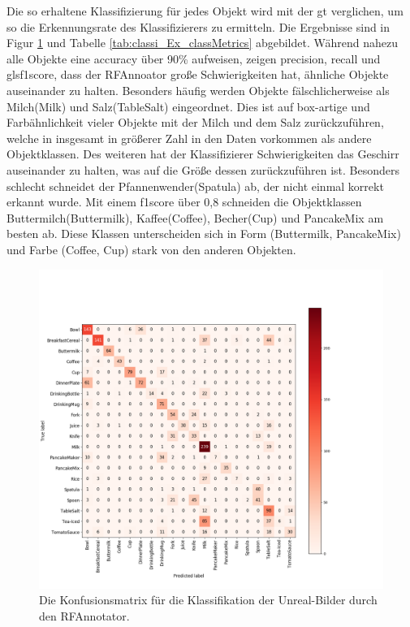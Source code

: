 Die so erhaltene Klassifizierung für jedes Objekt wird mit der \gls{gt} verglichen, um so die Erkennungsrate des Klassifizierers zu ermitteln. Die Ergebnisse sind in Figur \ref{fig:classi_Ex_confMatrix} und Tabelle \ref{tab:classi_Ex_classMetrics} abgebildet. Während nahezu alle Objekte eine \gls{accuracy} über 90\% aufweisen, zeigen \gls{precision}, \gls{recall} und gls{f1score}, dass der RFAnnoator große Schwierigkeiten hat, ähnliche Objekte auseinander zu halten. Besonders häufig werden Objekte fälschlicherweise als Milch(Milk) und Salz(TableSalt)  eingeordnet. Dies ist auf box-artige und Farbähnlichkeit vieler Objekte mit der Milch und dem Salz zurückzuführen, welche in insgesamt in größerer Zahl in den Daten vorkommen als andere Objektklassen. Des weiteren hat der Klassifizierer Schwierigkeiten das Geschirr auseinander zu halten, was auf die Größe dessen zurückzuführen ist. Besonders schlecht schneidet der Pfannenwender(Spatula) ab, der nicht einmal korrekt erkannt wurde. Mit einem \gls{f1score} über 0,8 schneiden die Objektklassen Buttermilch(Buttermilk), Kaffee(Coffee), Becher(Cup) und PancakeMix am besten ab. Diese Klassen unterscheiden sich in Form (Buttermilk, PancakeMix) und Farbe (Coffee, Cup) stark von den anderen Objekten.  

\begin{figure}
	\includegraphics[scale=.5]{img/chapter6/classifierRFconf_matrix.png}
\caption[Ergebnisse der Klassifizierung durch den RFAnnotators]{Die Konfusionsmatrix für die Klassifikation der Unreal-Bilder durch den RFAnnotator.}
\label{fig:classi_Ex_confMatrix}
\end{figure}

